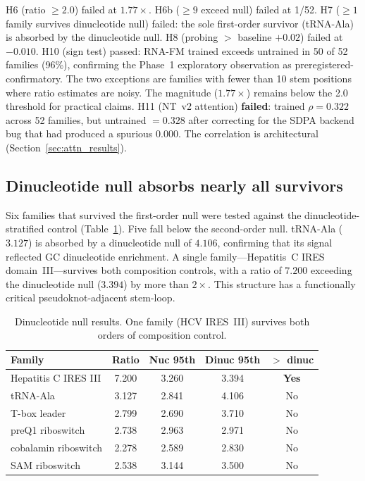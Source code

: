 \documentclass[11pt]{article}
\begin{document}
H6 (ratio $\geq 2.0$) failed at $1.77\times$.  H6b ($\geq 9$ exceed
null) failed at 1/52.  H7 ($\geq 1$ family survives dinucleotide
null) failed: the sole first-order survivor (tRNA-Ala) is absorbed by
the dinucleotide null.  H8 (probing $>$ baseline $+ 0.02$) failed at
$-0.010$.  H10 (sign test) passed: RNA-FM trained exceeds untrained in
50 of 52 families (96\%), confirming the Phase~1 exploratory
observation as preregistered-confirmatory.  The two exceptions are
families with fewer than 10 stem positions where ratio estimates are
noisy.  The magnitude ($1.77\times$) remains below the 2.0 threshold
for practical claims.  H11 (NT~v2 attention) \textbf{failed}: trained $\rho =
0.322$ across 52 families, but untrained $= 0.328$ after correcting
for the SDPA backend bug that had produced a spurious $0.000$.  The
correlation is architectural (Section~\ref{sec:attn_results}).

\subsection{Dinucleotide null absorbs nearly all survivors}
\label{sec:dinuc_results}

Six families that survived the first-order null were tested against
the dinucleotide-stratified control (Table~\ref{tab:dinuc}).  Five
fall below the second-order null.  tRNA-Ala ($3.127$) is absorbed by
a dinucleotide null of $4.106$, confirming that its signal reflected
GC dinucleotide enrichment.  A single family---Hepatitis~C IRES
domain~III---survives both composition controls, with a ratio of
$7.200$ exceeding the dinucleotide null ($3.394$) by more than
$2\times$.  This structure has a functionally critical
pseudoknot-adjacent stem-loop.

\begin{table}[t]
\centering
\caption{Dinucleotide null results.  One family (HCV IRES~III)
  survives both orders of composition control.}
\label{tab:dinuc}
\begin{tabular}{@{}lcccc@{}}
\toprule
\textbf{Family} & \textbf{Ratio} &
  \textbf{Nuc 95th} & \textbf{Dinuc 95th} & \textbf{$>$ dinuc} \\
\midrule
Hepatitis C IRES III & 7.200 & 3.260 & 3.394 & \textbf{Yes} \\
tRNA-Ala          & 3.127 & 2.841 & 4.106 & No \\
T-box leader      & 2.799 & 2.690 & 3.710 & No \\
preQ1 riboswitch  & 2.738 & 2.963 & 2.971 & No \\
cobalamin riboswitch & 2.278 & 2.589 & 2.830 & No \\
SAM riboswitch    & 2.538 & 3.144 & 3.500 & No \\
\bottomrule
\end{tabular}
\end{table}
\end{document}
